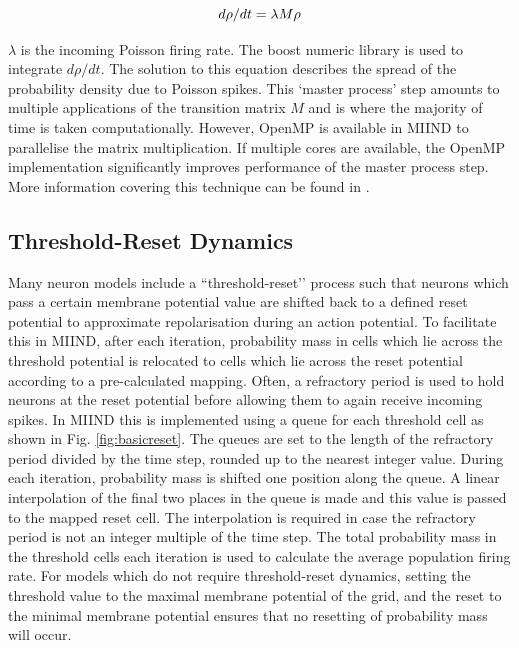 \documentclass[utf8]{frontiersSCNS} %
\begin{document}
\begin{equation}  
d\rho/dt = \lambda M \rho \\
\label{eq:masterprocess}
\end{equation}

$\lambda$ is the incoming Poisson firing rate. The boost numeric library is used to integrate $d\rho/dt$. The solution to this equation describes the spread of the probability density due to Poisson spikes. This `master process' step amounts to multiple applications of the transition matrix $M$ and is where the majority of time is taken computationally. However, OpenMP is available in MIIND to parallelise the matrix multiplication. If multiple cores are available, the OpenMP implementation significantly improves performance of the master process step. More information covering this technique can be found in \cite{de2019computational,de2013generic}.\\

\subsection{Threshold-Reset Dynamics}
Many neuron models include a ``threshold-reset’’ process such that neurons which pass a certain membrane potential value are shifted back to a defined reset potential to approximate repolarisation during an action potential. To facilitate this in MIIND, after each iteration, probability mass in cells which lie across the threshold potential is relocated to cells which lie across the reset potential according to a pre-calculated mapping. Often, a refractory period is used to hold neurons at the reset potential before allowing them to again receive incoming spikes. In MIIND this is implemented using a queue for each threshold cell as shown in Fig. \ref{fig:basicreset}. The queues are set to the length of the refractory period divided by the time step, rounded up to the nearest integer value. During each iteration, probability mass is shifted one position along the queue. A linear interpolation of the final two places in the queue is made and this value is passed to the mapped reset cell. The interpolation is required in case the refractory period is not an integer multiple of the time step. The total probability mass in the threshold cells each iteration is used to calculate the average population firing rate. For models which do not require threshold-reset dynamics, setting the threshold value to the maximal membrane potential of the grid, and the reset to the minimal membrane potential ensures that no resetting of probability mass will occur.\\
\end{document}
